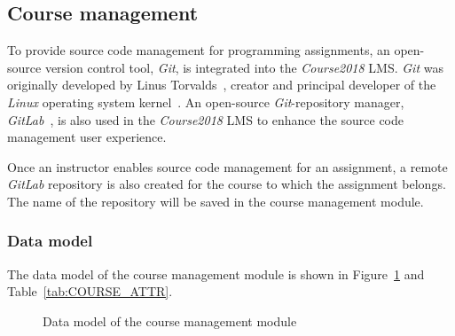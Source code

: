 
\subsection{Course management}
To provide source code management for programming assignments,
an open-source version control tool,
\emph{Git}, is integrated into the \emph{Course2018} LMS.
\emph{Git} was originally developed by Linus Torvalds~\cite{git},
creator and principal developer of the \emph{Linux} operating system
kernel~\cite{lTorvalds}.
An open-source \emph{Git}-repository manager, \emph{GitLab}~\cite{Agitlab},
is also used in the \emph{Course2018} LMS to enhance the source code management
user experience.

\medskip
Once an instructor enables source code management for an assignment, a remote
\emph{GitLab} repository is also created for the course to which the assignment
belongs. The name of the repository will be saved in the course management
module.


\subsubsection{Data model}
The data model of the course management module is shown in
Figure~\ref{fig:COURSE_ER} and Table~\ref{tab:COURSE_ATTR}. \bigskip

\begin{figure}[ht]
    \centering

    \usetikzlibrary{er, positioning}

    \caption{Data model of the course management module}
    \label{fig:COURSE_ER}
\end{figure}


